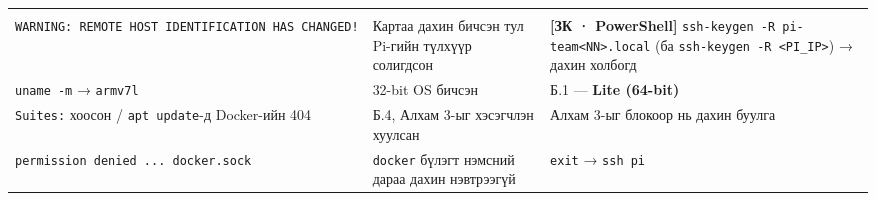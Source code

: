 \begin{longtable}[]{@{}lll@{}}
\begin{minipage}[t]{0.30\columnwidth}
\end{minipage}\tabularnewline
\begin{minipage}[t]{0.30\columnwidth}\raggedright
\texttt{WARNING:\allowbreak{}\ REMOTE\ HOST\ IDENTIFICATION\ HAS\ CHANGED!}\strut
\end{minipage} & \begin{minipage}[t]{0.30\columnwidth}\raggedright
Картаа дахин бичсэн тул Pi-гийн түлхүүр солигдсон\strut
\end{minipage} & \begin{minipage}[t]{0.30\columnwidth}\raggedright
\textbf{{[}ЗК · PowerShell{]}} \texttt{ssh-keygen\ -R\ pi-team\textless{}NN\textgreater{}.\allowbreak{}local} (ба \texttt{ssh-keygen\ -R\ \textless{}PI\_\allowbreak{}IP\textgreater{}}) → дахин холбогд\strut
\end{minipage}\tabularnewline
\begin{minipage}[t]{0.30\columnwidth}\raggedright
\texttt{uname\ -m} → \texttt{armv7l}\strut
\end{minipage} & \begin{minipage}[t]{0.30\columnwidth}\raggedright
32-bit OS бичсэн\strut
\end{minipage} & \begin{minipage}[t]{0.30\columnwidth}\raggedright
Б.1 --- \textbf{Lite (64-bit)}\strut
\end{minipage}\tabularnewline
\begin{minipage}[t]{0.30\columnwidth}\raggedright
\texttt{Suites:} хоосон / \texttt{apt\ update}-д Docker-ийн 404\strut
\end{minipage} & \begin{minipage}[t]{0.30\columnwidth}\raggedright
Б.4, Алхам 3-ыг хэсэгчлэн хуулсан\strut
\end{minipage} & \begin{minipage}[t]{0.30\columnwidth}\raggedright
Алхам 3-ыг блокоор нь дахин буулга\strut
\end{minipage}\tabularnewline
\begin{minipage}[t]{0.30\columnwidth}\raggedright
\texttt{permission\ denied\ .\allowbreak{}.\allowbreak{}.\allowbreak{}\ docker.\allowbreak{}sock}\strut
\end{minipage} & \begin{minipage}[t]{0.30\columnwidth}\raggedright
\texttt{docker} бүлэгт нэмсний дараа дахин нэвтрээгүй\strut
\end{minipage} & \begin{minipage}[t]{0.30\columnwidth}\raggedright
\texttt{exit} → \texttt{ssh\ pi}\strut

\end{minipage}
\end{longtable}
